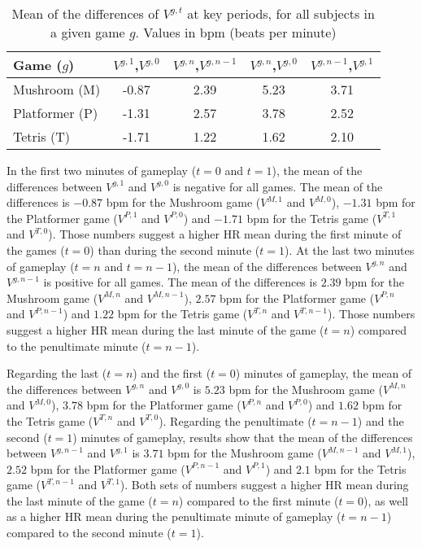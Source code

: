 \begin{table}
\caption{Mean of the differences of $V^{g,t}$ at key periods, for all subjects in a given game $g$. Values in bpm (beats per minute)}
\label{table:mean}
\centering
\begin{tabular}{p{.21\linewidth}cccc}
\toprule%
\textbf{Game ($g$)} & \textbf{$V^{g,1}$,$V^{g,0}$} & \textbf{$V^{g,n}$,$V^{g,n-1}$} & \textbf{$V^{g,n}$,$V^{g,0}$} & \textbf{$V^{g,n-1}$,$V^{g,1}$} \\
\midrule%
Mushroom (M) & -0.87   & 2.39 & 5.23 & 3.71 \\
Platformer (P) & -1.31   & 2.57 & 3.78  & 2.52  \\
Tetris (T) & -1.71 & 1.22  & 1.62    & 2.10 \\
\bottomrule%
\end{tabular}
\end{table}

In the first two minutes of gameplay ($t=0$ and $t=1$), the mean of the differences between $V^{g,1}$ and $V^{g,0}$ is negative for all games. The mean of the differences is $-0.87$ bpm for the Mushroom game ($V^{M,1}$ and $V^{M,0}$), $-1.31$ bpm for the Platformer game ($V^{P,1}$ and $V^{P,0}$) and $-1.71$ bpm for the Tetris game ($V^{T,1}$ and $V^{T,0}$). Those numbers suggest a higher HR mean during the first minute of the games ($t=0$) than during the second minute ($t=1$). At the last two minutes of gameplay ($t=n$ and $t=n-1$), the mean of the differences between $V^{g,n}$ and $V^{g,n-1}$ is positive for all games. The mean of the differences is $2.39$ bpm for the Mushroom game ($V^{M,n}$ and $V^{M,n-1}$), $2.57$ bpm for the Platformer game ($V^{P,n}$ and $V^{P,n-1}$) and $1.22$ bpm for the Tetris game ($V^{T,n}$ and $V^{T,n-1}$). Those numbers suggest a higher HR mean during the last minute of the game ($t=n$) compared to the penultimate minute ($t=n-1$).

Regarding the last ($t=n$) and the first ($t=0$) minutes of gameplay, the mean of the differences between $V^{g,n}$ and $V^{g,0}$ is $5.23$ bpm for the Mushroom game ($V^{M,n}$ and $V^{M,0}$), $3.78$ bpm for the Platformer game ($V^{P,n}$ and $V^{P,0}$) and $1.62$ bpm for the Tetris game ($V^{T,n}$ and $V^{T,0}$). Regarding the penultimate ($t=n-1$) and the second ($t=1$) minutes of gameplay, results show that the mean of the differences between $V^{g,n-1}$ and $V^{g,1}$ is $3.71$ bpm for the Mushroom game ($V^{M,n-1}$ and $V^{M,1}$), $2.52$ bpm for the Platformer game ($V^{P,n-1}$ and $V^{P,1}$) and $2.1$ bpm for the Tetris game ($V^{T,n-1}$ and $V^{T,1}$). Both sets of numbers suggest a higher HR mean during the last minute of the game ($t=n$) compared to the first minute ($t=0$), as well as a higher HR mean during the penultimate minute of gameplay ($t=n-1$) compared to the second minute ($t=1$).

